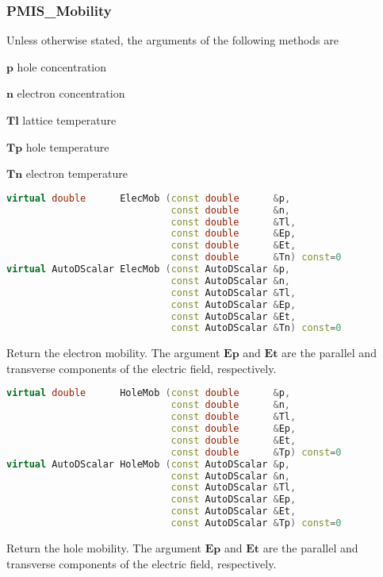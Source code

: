 \documentclass[oneside,12pt]{cgd_book}
\begin{document}
\subsubsection{PMIS\_Mobility}
Unless otherwise stated, the arguments of the following methods are
\par
\begin{compactitem}
\item $\mathbf{p}$ hole concentration
\par
\item $\mathbf{n}$ electron concentration
\par
\item $\mathbf{Tl}$ lattice temperature
\par
\item $\mathbf{Tp}$ hole temperature
\par
\item $\mathbf{Tn}$ electron temperature
\par
\end{compactitem}
\begin{lstlisting}[language={C++}]
virtual double      ElecMob (const double      &p,
                             const double      &n,
                             const double      &Tl,
                             const double      &Ep,
                             const double      &Et,
                             const double      &Tn) const=0
virtual AutoDScalar ElecMob (const AutoDScalar &p,
                             const AutoDScalar &n,
                             const AutoDScalar &Tl,
                             const AutoDScalar &Ep,
                             const AutoDScalar &Et,
                             const AutoDScalar &Tn) const=0
\end{lstlisting}
Return the electron mobility. The argument $\mathbf{Ep}$ and $\mathbf{Et}$
are
            the parallel and transverse components of the electric field, respectively.
\par
\begin{lstlisting}[language={C++}]
virtual double      HoleMob (const double      &p,
                             const double      &n,
                             const double      &Tl,
                             const double      &Ep,
                             const double      &Et,
                             const double      &Tp) const=0
virtual AutoDScalar HoleMob (const AutoDScalar &p,
                             const AutoDScalar &n,
                             const AutoDScalar &Tl,
                             const AutoDScalar &Ep,
                             const AutoDScalar &Et,
                             const AutoDScalar &Tp) const=0
\end{lstlisting}
Return the hole mobility. The argument $\mathbf{Ep}$ and $\mathbf{Et}$
are the
            parallel and transverse components of the electric field, respectively.
\par
\end{document}
